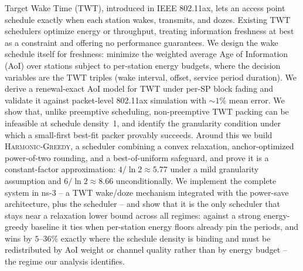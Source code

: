 Target Wake Time (TWT), introduced in IEEE 802.11ax, lets an access point
schedule exactly when each station wakes, transmits, and dozes. Existing TWT
schedulers optimize energy or throughput, treating information freshness at
best as a constraint and offering no performance guarantees. We design the
wake schedule itself for freshness: minimize the weighted average Age of
Information (AoI) over stations subject to per-station energy budgets, where
the decision variables are the TWT triples (wake interval, offset, service
period duration). We derive a renewal-exact AoI model for TWT under per-SP
block fading and validate it against packet-level 802.11ax simulation with
${\sim}1\%$ mean error. We show that, unlike preemptive scheduling, non-preemptive TWT
packing can be infeasible at schedule density~1, and identify the granularity
condition under which a small-first best-fit packer provably succeeds. Around
this we build \textsc{Harmonic-Greedy}, a scheduler combining a convex
relaxation, anchor-optimized power-of-two rounding, and a best-of-uniform
safeguard, and prove it is a constant-factor approximation: $4/\ln 2 \approx
5.77$ under a mild granularity assumption and $6/\ln 2 \approx 8.66$
unconditionally. We implement the complete system in ns-3 -- a TWT wake/doze
mechanism integrated with the power-save architecture, plus the scheduler --
and show that it is the only scheduler that stays near a relaxation lower
bound across all regimes: against a strong energy-greedy baseline it ties
when per-station energy floors already pin the periods, and wins by
$5$--$36\%$ exactly where the schedule density is binding and must be
redistributed by AoI weight or channel quality rather than by energy budget
-- the regime our analysis identifies.
